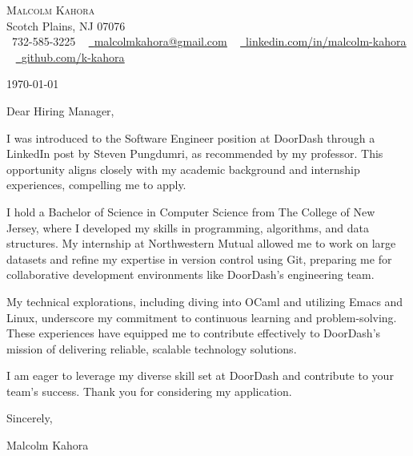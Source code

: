 \documentclass[letterpaper,11pt]{article}
\begin{document}
\begin{center}
    {\Huge \scshape Malcolm Kahora} \\ \vspace{1pt}
    Scotch Plains, NJ 07076 \\ \vspace{1pt}
    \small \raisebox{-0.1\height}\faPhone\ 732-585-3225 ~ \href{mailto:malcolmkahora@gmail.com}{\raisebox{-0.2\height}\faEnvelope\  \underline{malcolmkahora@gmail.com}} ~ 
    \href{https://linkedin.com/in/malcolm-kahora/}{\raisebox{-0.2\height}\faLinkedin\ \underline{linkedin.com/in/malcolm-kahora}}  ~
    \href{https://github.com/k-kahora}{\raisebox{-0.2\height}\faGithub\ \underline{github.com/k-kahora}}
    \vspace{-8pt}
\end{center}

\today

Dear Hiring Manager,

I was introduced to the Software Engineer position at DoorDash through a LinkedIn post by Steven Pungdumri, as recommended by my professor. This opportunity aligns closely with my academic background and internship experiences, compelling me to apply.

I hold a Bachelor of Science in Computer Science from The College of New Jersey, where I developed my skills in programming, algorithms, and data structures. My internship at Northwestern Mutual allowed me to work on large datasets and refine my expertise in version control using Git, preparing me for collaborative development environments like DoorDash's engineering team.

My technical explorations, including diving into OCaml and utilizing Emacs and Linux, underscore my commitment to continuous learning and problem-solving. These experiences have equipped me to contribute effectively to DoorDash's mission of delivering reliable, scalable technology solutions.

I am eager to leverage my diverse skill set at DoorDash and contribute to your team's success. Thank you for considering my application.

Sincerely,

\vspace{50pt}
Malcolm Kahora
\end{document}
